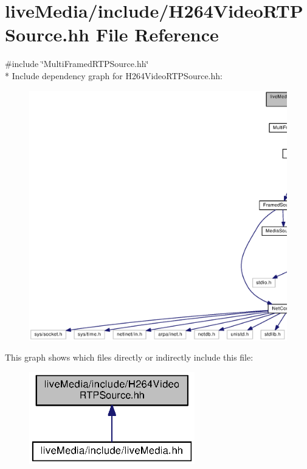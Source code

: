 \section{live\+Media/include/\+H264\+Video\+R\+T\+P\+Source.hh File Reference}
\label{H264VideoRTPSource_8hh}
{\ttfamily \#include \char`\"{}Multi\+Framed\+R\+T\+P\+Source.\+hh\char`\"{}}\\*
Include dependency graph for H264\+Video\+R\+T\+P\+Source.\+hh\+:
\nopagebreak
\begin{figure}[H]
\begin{center}
\leavevmode
\includegraphics[width=350pt]{H264VideoRTPSource_8hh__incl}
\end{center}
\end{figure}
This graph shows which files directly or indirectly include this file\+:
\nopagebreak
\begin{figure}[H]
\begin{center}
\leavevmode
\includegraphics[width=204pt]{H264VideoRTPSource_8hh__dep__incl}
\end{center}
\end{figure}

